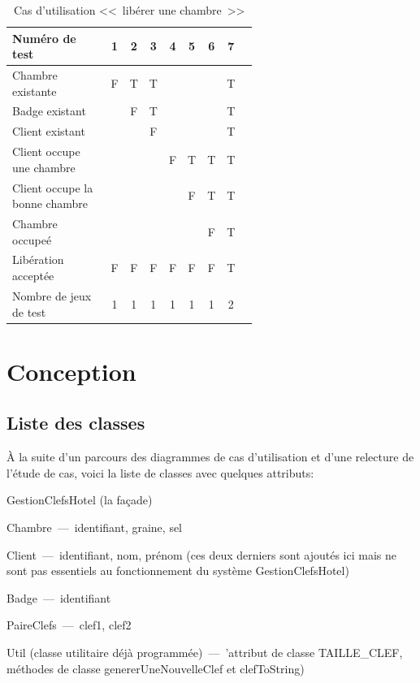 \documentclass[11pt,article]{article}
\begin{document}
        \begin{table}[htbp!]
            \begin{tabular}{|p{0.6\linewidth}|c|c|c|c|c|c|c|c|}
                \hline
                Numéro de test
                    &1&2&3&4&5&6&7\\
                \hline
                \hline

                Chambre existante
                    &F&T&T& & & &T\\
                \hline
                Badge existant
                    & &F&T& & & &T\\
                \hline
                Client existant
                    & & &F& & & &T\\
                \hline
				\hline
                Client occupe une chambre
                    & & & &F&T&T&T\\
                \hline
                Client occupe la bonne chambre
                    & & & & &F&T&T\\
				\hline
				\hline
				Chambre occupeé
					& & & & & &F&T\\
                \hline
                \hline                Libération acceptée
                    &F&F&F&F&F&F&T\\
                \hline
                \hline
                Nombre de jeux de test
                    &1&1&1&1&1&1&2 \\
                \hline
            \end{tabular}
            \caption{Cas d'utilisation <<~libérer une chambre~>>}
        \end{table}
\newpage

\section{Conception}

\subsection{Liste des classes}

À la suite d'un parcours des diagrammes de cas d'utilisation et d'une
relecture de l'étude de cas, voici la liste de classes avec quelques
attributs:
\begin{compactitem}
\item \textsf{GestionClefsHotel} (la façade)
\item \textsf{Chambre}~---~identifiant, graine, sel
\item \textsf{Client}~---~identifiant, nom, prénom (ces deux derniers
  sont ajoutés ici mais ne sont pas essentiels au fonctionnement du
  système \textsf{GestionClefsHotel})
\item \textsf{Badge}~---~identifiant
\item \textsf{PaireClefs}~---~clef1, clef2
\item \textsf{Util} (classe utilitaire déjà programmée)~---~'attribut
  de classe \textsf{TAILLE\_CLEF}, méthodes de classe
  \textsf{genererUneNouvelleClef} et \textsf{clefToString})
\end{compactitem}
\newpage
\end{document}
